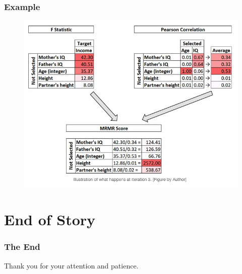 \documentclass{beamer}
\begin{document}
    \begin{frame}
        \frametitle{Example}
        \begin{figure}
            \begin{center}
                \includegraphics[scale=0.3]{fs_example.png}
            \end{center}
        \end{figure}
    \end{frame}

    \section{End of Story}
    \begin{frame}
        \frametitle{The End}
        Thank you for your attention and patience.
    \end{frame}
\end{document}
